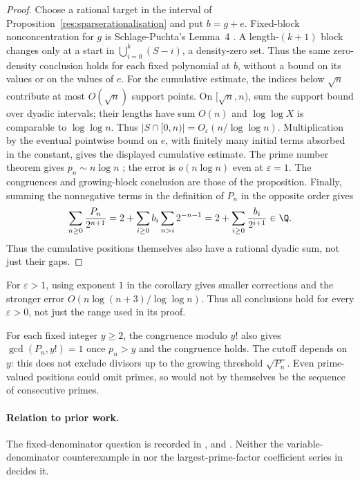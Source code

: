 \documentclass[11pt]{article}
\begin{document}
\begin{proof}
Choose a rational target in the interval
of Proposition~\ref{res:sparserationalisation} and put $b=g+e$.  Fixed-block nonconcentration for $g$ is
Schlage-Puchta's Lemma~4 \cite{schlagepuchta2011}.
A length-$(k+1)$ block changes only at a start in
$\bigcup_{i=0}^{k}(S-i)$, a density-zero set.  Thus the same zero-density
conclusion holds for each fixed polynomial at $b$, without a bound on
its values or on the values of $e$.  For the cumulative estimate, the
indices below $\sqrt n$ contribute at most $O(\sqrt n)$ support points.
On $[\sqrt n,n)$, sum the support bound over dyadic intervals; their
lengths have sum $O(n)$ and $\log\log X$ is comparable to $\log\log n$.
Thus $|S\cap[0,n)|=O_\varepsilon(n/\log\log n)$.  Multiplication by the
eventual pointwise bound on $e$, with finitely many initial terms absorbed
in the constant, gives the displayed cumulative estimate.
The prime number theorem gives $p_n\sim n\log n$ \cite[Chapter~6]{mv2007};
the error is $o(n\log n)$ even at $\varepsilon=1$.
The congruences and growing-block conclusion are those of the proposition.
Finally, summing the nonnegative terms in the definition of $P_n$ in the
opposite order gives
\[
 \sum_{n\ge0}\frac{P_n}{2^{n+1}}
 =2+\sum_{i\ge0}b_i\sum_{n>i}2^{-n-1}
 =2+\sum_{i\ge0}\frac{b_i}{2^{i+1}}\in\Q.
\]
Thus the cumulative positions themselves also have a rational dyadic sum,
not just their gaps.
\end{proof}

For $\varepsilon>1$, using exponent $1$ in the corollary gives smaller
corrections and the stronger error $O(n\log(n+3)/\log\log n)$.
Thus all conclusions hold for every $\varepsilon>0$, not just the
range used in its proof.

For each fixed integer $y\ge2$, the congruence modulo $y!$ also gives
$\gcd(P_n,y!)=1$ once $p_n>y$ and the congruence holds.  The cutoff depends
on $y$: this does not exclude divisors up to the growing threshold
$\sqrt{P_n}$.  Even prime-valued positions could omit primes, so would
not by themselves be the sequence of consecutive primes.

\paragraph{Relation to prior work.}
The fixed-denominator question is recorded in
\cite[p.~94]{erdos1958}, \cite[p.~62]{erdosgraham1980} and
\cite[p.~103]{erdos1988}.  Neither the variable-denominator counterexample
in \cite{kovac2026} nor the largest-prime-factor coefficient series in
\cite[\S7]{erdospomerance1978} decides it.
\end{document}
